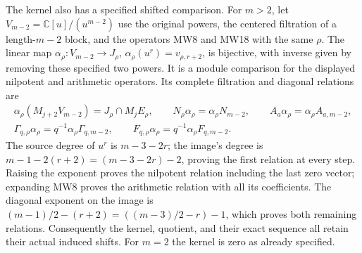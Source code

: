 The kernel also has a specified shifted comparison. For \(m>2\), let
\(V_{m-2}=\mathbb C[u]/(u^{m-2})\) use the original powers, the
centered filtration of a length-\(m-2\) block, and the operators
MW8 and MW18 with the same \(\rho\). The linear map
\(\alpha_\rho:V_{m-2}\to J_\rho\),
\(\alpha_\rho(u^r)=v_{\rho,r+2}\), is bijective, with inverse given
by removing these specified two powers. It is a module comparison
for the displayed nilpotent and arithmetic operators. Its complete
filtration and diagonal relations are
\[
 \begin{gathered}
 \alpha_\rho(M_{j+2}V_{m-2})=J_\rho\cap M_jE_\rho,\qquad
 N_\rho\alpha_\rho=\alpha_\rho N_{m-2},\qquad
 A_a\alpha_\rho=\alpha_\rho A_{a,m-2},\\
 \Gamma_{q,\rho}\alpha_\rho
          =q^{-1}\alpha_\rho\Gamma_{q,m-2},\qquad
 F_{q,\rho}\alpha_\rho=q^{-1}\alpha_\rho F_{q,m-2}.
 \end{gathered}
 \tag{MW26a}
\]
The source degree of \(u^r\) is \(m-3-2r\); the image's degree is
\(m-1-2(r+2)=(m-3-2r)-2\), proving the first relation at every
step. Raising the exponent proves the nilpotent relation including
the last zero vector; expanding MW8 proves the arithmetic relation
with all its coefficients. The diagonal exponent on the image is
\((m-1)/2-(r+2)=((m-3)/2-r)-1\), which proves both remaining
relations. Consequently the kernel, quotient, and their exact
sequence all retain their actual induced shifts. For \(m=2\) the
kernel is zero as already specified.

